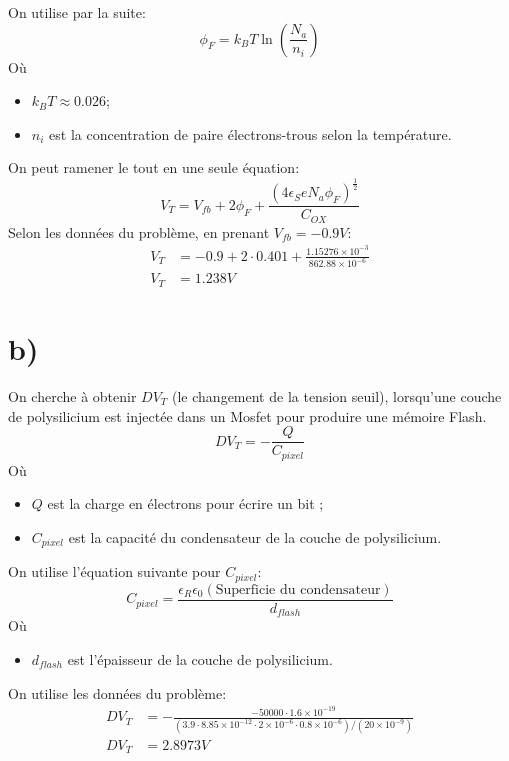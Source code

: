 On utilise par la suite:
\begin{equation}
\phi_F = k_{B}T\ln\left(\frac{N_a}{n_i}\right)
\end{equation}
Où
\begin{itemize}
\item $k_{B}T \approx 0.026$;
\item $n_i$ est la concentration de paire électrons-trous selon la température.
\end{itemize}
On peut ramener le tout en une seule équation:
\begin{equation}
V_T = V_{fb} + 2\phi_F + \frac{(4\epsilon_S eN_a \phi_F)^{\frac{1}{2}}}{C_{OX}}
\end{equation}
Selon les données du problème, en prenant $V_{fb} = -0.9V$:
\begin{align}
V_T &= -0.9 + 2\cdot 0.401 + \frac{1.15276 \times 10^{-3}}{862.88\times 10^{-6}}\\
V_T &= 1.238V
\end{align}

\section*{b)}
On cherche à obtenir $DV_T$ (le changement de la tension seuil), lorsqu'une couche de polysilicium est injectée dans un Mosfet pour produire une mémoire Flash. 
\begin{equation}
DV_T = -\frac{Q}{C_{pixel}}
\end{equation}
Où
\begin{itemize}
\item $Q$ est la charge en électrons pour écrire un bit ;
\item $C_{pixel}$ est la capacité du condensateur de la couche de polysilicium.
\end{itemize}
On utilise l'équation suivante pour $C_{pixel}$:
\begin{equation}
C_{pixel} = \frac{\epsilon_R \epsilon_0 (\mbox{Superficie du condensateur})}{d_{flash}}
\end{equation}
Où
\begin{itemize}
\item $d_{flash}$ est l'épaisseur de la couche de polysilicium.
\end{itemize}
On utilise les données du problème:
\begin{align}
DV_T &= -\frac{-50000 \cdot 1.6\times 10^{-19}}{(3.9\cdot8.85\times 10^{-12}\cdot 2\times 10^{-6}\cdot 0.8\times 10^{-6})/(20 \times 10^{-9})}\\
DV_T &= 2.8973 V
\end{align} 

